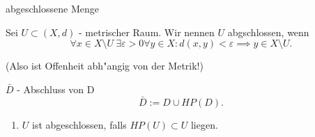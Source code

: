 \documentclass[class=article, crop=false]{standalone}
\begin{document}
\begin{zettel}{abgeschlossene Menge}
\begin{flashcard}[]{}
	\begin{definition}[abgeschlossen]
		Sei $U \subset (X,d)$ - metrischer Raum. Wir nennen $U$ abgschlossen, wenn
		\[
			\forall x \in  X \setminus U \  \exists \varepsilon > 0 \forall y \in X : d(x,y) < \varepsilon \implies y \in  X \setminus U
		.\]

		(Also ist Offenheit abh"angig von der Metrik!)
	\end{definition}
\end{flashcard}

\begin{flashcard}[]{}
	\begin{definition}[Abschluss]
		$ \bar{D} $ - Abschluss von D
		\[
			\bar{D} := D \cup HP(D)
		.\]
	\end{definition}
\end{flashcard}

\begin{enumerate}
	\item $U$ ist abgeschlossen, falls $HP(U) \subset U$ liegen.
\end{enumerate}

\end{zettel}
\end{document}
